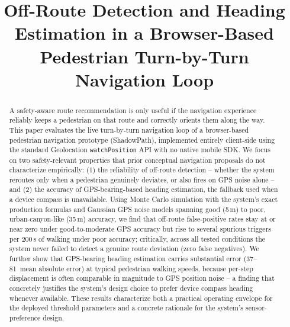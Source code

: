 \documentclass[conference]{IEEEtran}
\begin{document}
\title{Off-Route Detection and Heading Estimation in a Browser-Based Pedestrian Turn-by-Turn Navigation Loop\\}

\author{
\and
{}
}

\maketitle

\begin{abstract}
A safety-aware route recommendation is only useful if the navigation experience reliably keeps a pedestrian on that route and correctly orients them along the way. This paper evaluates the live turn-by-turn navigation loop of a browser-based pedestrian navigation prototype (ShadowPath), implemented entirely client-side using the standard Geolocation \texttt{watchPosition} API with no native mobile SDK. We focus on two safety-relevant properties that prior conceptual navigation proposals do not characterize empirically: (1) the reliability of off-route detection -- whether the system reroutes only when a pedestrian genuinely deviates, or also fires on GPS noise alone -- and (2) the accuracy of GPS-bearing-based heading estimation, the fallback used when a device compass is unavailable. Using Monte Carlo simulation with the system's exact production formulas and Gaussian GPS noise models spanning good (5\,m) to poor, urban-canyon-like (35\,m) accuracy, we find that off-route false-positive rates stay at or near zero under good-to-moderate GPS accuracy but rise to several spurious triggers per 200\,s of walking under poor accuracy; critically, across all tested conditions the system never failed to detect a genuine route deviation (zero false negatives). We further show that GPS-bearing heading estimation carries substantial error (37--81\textdegree\ mean absolute error) at typical pedestrian walking speeds, because per-step displacement is often comparable in magnitude to GPS position noise -- a finding that concretely justifies the system's design choice to prefer device compass heading whenever available. These results characterize both a practical operating envelope for the deployed threshold parameters and a concrete rationale for the system's sensor-preference design.
\end{abstract}
\end{document}
